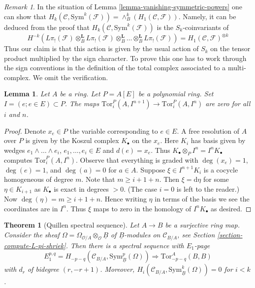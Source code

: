 \documentclass[10pt,a4paper]{article}
\theoremstyle{plain}
\newtheorem{theorem}[subsection]{Theorem}
\newtheorem{lemma}[subsection]{Lemma}
\theoremstyle{definition}
\theoremstyle{remark}
\newtheorem{remark}[subsection]{Remark}
\numberwithin{equation}{subsection}
\begin{document}
\begin{remark}
\label{remark-first-homology-symmetric-power}
In the situation of Lemma \ref{lemma-vanishing-symmetric-powers}
one can show that
$H_k(\mathcal{C}, \text{Sym}^k(\mathcal{F})) =
\wedge^k_B(H_1(\mathcal{C}, \mathcal{F}))$.
Namely, it can be deduced from the proof that
$H_k(\mathcal{C}, \text{Sym}^k(\mathcal{F}))$ is the $S_k$-coinvariants
of
$$
H^{-k}(L\pi_!(\mathcal{F}) \otimes_B^\mathbf{L}
L\pi_!(\mathcal{F}) \otimes_B^\mathbf{L}
\ldots \otimes_B^\mathbf{L} L\pi_!(\mathcal{F})) =
H_1(\mathcal{C}, \mathcal{F})^{\otimes k}
$$
Thus our claim is that this action is given by the usual action
of $S_k$ on the tensor product multiplied by the sign character.
To prove this one has to work through the sign conventions
in the definition of the total complex associated to a
multi-complex. We omit the verification.
\end{remark}

\begin{lemma}
\label{lemma-map-tors-zero}
Let $A$ be a ring. Let $P = A[E]$ be a polynomial ring.
Set $I = (e; e \in E) \subset P$. The maps
$\text{Tor}_i^P(A, I^{n + 1}) \to \text{Tor}_i^P(A, I^n)$
are zero for all $i$ and $n$.
\end{lemma}

\begin{proof}
Denote $x_e \in P$ the variable corresponding to $e \in E$.
A free resolution of $A$ over $P$ is given by the Koszul complex
$K_\bullet$ on the $x_e$. Here $K_i$ has basis given by wedges
$e_1 \wedge \ldots \wedge e_i$, $e_1, \ldots, e_i \in E$ and $d(e) = x_e$.
Thus $K_\bullet \otimes_P I^n = I^nK_\bullet$ computes
$\text{Tor}_i^P(A, I^n)$. Observe that everything is graded
with $\deg(x_e) = 1$, $\deg(e) = 1$, and $\deg(a) = 0$ for $a \in A$.
Suppose $\xi \in I^{n + 1}K_i$ is a cocycle homogeneous of degree $m$.
Note that $m \geq i + 1 + n$. Then $\xi = \text{d}\eta$ for some
$\eta \in K_{i + 1}$ as $K_\bullet$ is exact in degrees $ > 0$.
(The case $i = 0$ is left to the reader.)
Now $\deg(\eta) = m \geq i + 1 + n$. Hence writing $\eta$
in terms of the basis we see the coordinates are in $I^n$.
Thus $\xi$ maps to zero in the homology of $I^nK_\bullet$ as desired.
\end{proof}

\begin{theorem}[Quillen spectral sequence]
\label{theorem-quillen-spectral-sequence}
Let $A \to B$ be a surjective ring map. Consider the sheaf
$\Omega = \Omega_{\mathcal{O}/A} \otimes_\mathcal{O} \underline{B}$ of
$\underline{B}$-modules on $\mathcal{C}_{B/A}$, see
Section \ref{section-compute-L-pi-shriek}.
Then there is a spectral sequence with $E_1$-page
$$
E_1^{p, q} =
H_{- p - q}(\mathcal{C}_{B/A}, \text{Sym}^p_{\underline{B}}(\Omega))
\Rightarrow \text{Tor}^A_{- p - q}(B, B)
$$
with $d_r$ of bidegree $(r, -r + 1)$.
Moreover, $H_i(\mathcal{C}_{B/A}, \text{Sym}^k_{\underline{B}}(\Omega)) = 0$
for $i < k$.
\end{theorem}
\end{document}
